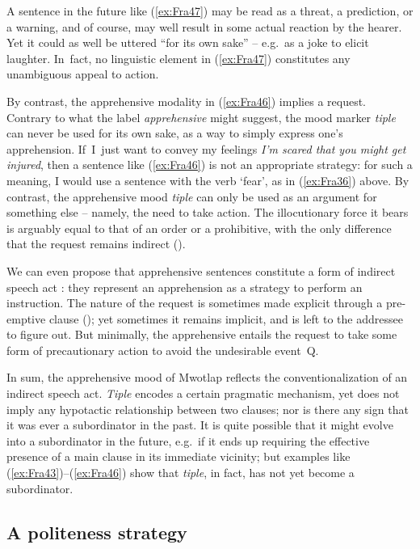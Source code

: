 \documentclass[output=paper,colorlinks,citecolor=brown]{langscibook}
\begin{document}
\noindent A sentence in the future like (\ref{ex:Fra47}) may be read as a threat, a prediction, or a warning, and of course, may well result in some actual reaction by the hearer. Yet it could as well be uttered ``for its own sake'' – e.g.\ as a joke to elicit laughter. In~fact, no linguistic element in (\ref{ex:Fra47}) constitutes any unambiguous appeal to action.


By contrast, the apprehensive modality in (\ref{ex:Fra46}) implies a request. Contrary to what the label \textit{apprehensive} might suggest, the mood marker \textit{tiple} can never be used for its own sake, as a way to simply express one's apprehension. If~I~just want to convey my feelings \textit{I'm scared that you might get injured}, then a sentence like (\ref{ex:Fra46}) is not an appropriate strategy: for such a meaning, I would use a sentence with the verb `fear', as in (\ref{ex:Fra36}) above. By contrast, the apprehensive mood \textit{tiple} can only be used as an argument for something else -- namely, the need to take action. The illocutionary force it bears is arguably equal to that of an \mbox{order} or a prohibitive, with the only difference that the request remains indirect \mbox{()}.


We can even propose that apprehensive sentences constitute a form of indirect speech act \citep{Searle1975}: they represent an apprehension as a strategy to perform an instruction. The nature of the request is sometimes made explicit through a pre-emptive clause (); yet sometimes it remains implicit, and is left to the addressee to figure out. But minimally, the apprehensive entails the request to take some form of precautionary action to avoid the undesirable event~Q. 


In sum, the apprehensive mood of Mwotlap reflects the conventionalization of an indirect speech act. \textit{Tiple} encodes a certain pragmatic mechanism, yet does not imply any hypotactic relationship between two clauses; nor is there any sign that it was ever a subordinator in the past. It is quite possible that it might evolve into a subordinator in the future, e.g.\ if it ends up requiring the effective presence of a main clause in its immediate vicinity; but examples like (\ref{ex:Fra43})--(\ref{ex:Fra46}) show that \textit{tiple}, in fact, has not yet become a subordinator.
 

\subsection{A politeness strategy}
\label{subsec:politeness}
 
\end{document}
